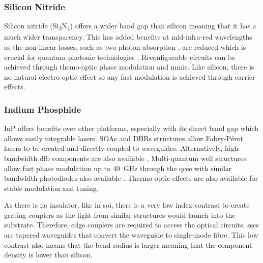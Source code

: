 
\subsubsection*{Silicon Nitride}

Silicon nitride (Si\textsubscript{3}N\textsubscript{4}) offers a wider band gap than silicon meaning that it has a much wider transparency. This has added benefits at mid-infra-red wavelengths as the non-linear losses, such as two-photon absorption \cite{tan2018nonlinear}, are reduced which is crucial for quantum photonic technologies \cite{lu2019chip}. Reconfigurable circuits can be achieved through themo-optic phase modulation and \acp{mmi}. Like silicon, there is no natural electro-optic effect so any fast modulation is achieved through carrier effects.


\subsubsection*{Indium Phosphide}

\Ac{InP} offers benefits over other platforms, especially with its direct band gap which allows easily integrable lasers. \Acp{SOA} and \acp{DBR} structures allow Fabry-P\'{e}rot lasers to be created and directly coupled to waveguides. Alternatively, high-bandwidth \ac{dfb} components are also available \cite{smit2014, JeppixRoadmap}. Multi-quantum well structures allow fast phase modulation up to \SI{40}{GHz} through the \ac{qcse} with similar bandwidth photodiodes also available \cite{smit2014}. Thermo-optic effects are also available for stable modulation and tuning.

As there is no insulator, like in \ac{soi}, there is a very low index contrast to create grating couplers as the light from similar structures would launch into the substrate. Therefore, edge couplers are required to access the optical circuits. \Acp{ssc} are tapered waveguides that convert the waveguide to single-mode fibre. This low contrast also means that the bend radius is larger meaning that the component density is lower than silicon.

